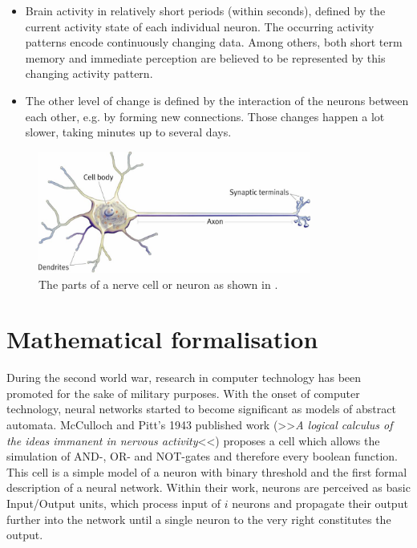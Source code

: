 \documentclass[10pt,a4paper,DIV=11]{scrreprt}
\begin{document}
\begin{itemize}
    \item Brain activity in relatively short periods (within seconds), defined by the current activity state of each individual neuron. 
    The occurring activity patterns encode continuously changing data. Among others, both short term memory and immediate perception are believed to be 
represented by this changing activity pattern.
    \item The other level of change is defined by the interaction of the neurons between each other, e.g. by forming new connections. 
    Those changes happen a lot slower, taking minutes up to several days.\cite{NEUINF} 
\end{itemize}

\begin{center}
\begin{figure}[H]

\includegraphics[width=0.8\textwidth,scale=1]{files/neuron.jpg}  
\caption{The parts of a nerve cell or neuron as shown in \cite{NEU}.}
\label{fig:neuron}
\end{figure}
\end{center}


\section{Mathematical formalisation}
\label{sec:mcpitts}
During the second world war, research in computer technology has been promoted for the sake of military purposes. With the onset of computer 
technology, neural networks started to become significant as models of abstract automata. McCulloch and Pitt's 1943 published work 
(>>\textit{A logical calculus of the ideas immanent in nervous activity}<<)\cite{MCP} proposes a cell which allows the simulation of AND-, OR- and 
NOT-gates and therefore every boolean function. This cell is a simple model of a neuron with binary threshold and the first formal description of a 
neural network. Within their work, neurons are perceived as basic Input/Output units, which process input of $i$ neurons and propagate their 
output further into the network until a single neuron to the very right constitutes the output.\\
\end{document}
